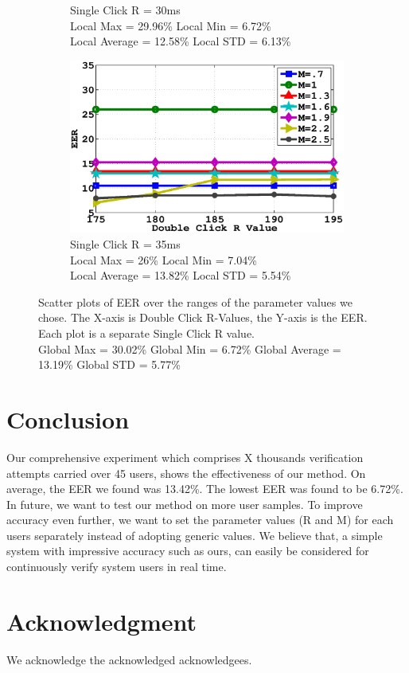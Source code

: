 \documentclass[conference]{IEEEtran}
\begin{document}
\begin{figure}[b!]
\begin{subfigure}{.5\textwidth}
  \caption{Single Click R = 30ms \\Local Max = 29.96\% Local Min = 6.72\% \\Local Average = 12.58\% Local STD = 6.13\%}
  \label{fig:sfig3}
\end{subfigure}%
\begin{subfigure}{.5\textwidth}
  \centering
  \includegraphics[width=.8\linewidth]{35.eps}
  \caption{Single Click R = 35ms \\Local Max = 26\% Local Min = 7.04\%\\Local Average = 13.82\% Local STD = 5.54\%}
  \label{fig:sfig4}
\end{subfigure}
\caption{Scatter plots of EER over the ranges of the parameter values we chose. The X-axis is Double Click R-Values, the Y-axis is the EER. Each plot is a separate Single Click R value. \\Global Max = 30.02\% Global Min = 6.72\% Global Average = 13.19\% Global STD = 5.77\%}
\label{fig:fig}
\end{figure}


\section{Conclusion}

Our comprehensive experiment which comprises X thousands verification attempts carried over 45 users, shows the effectiveness of our method. On average, the EER we found was 13.42\%. The lowest EER was found to be 6.72\%. In future, we want to test our method on more user samples. To improve accuracy even further, we want to set the parameter values (R and M) for each users separately instead of adopting generic values. We believe that, a simple system with impressive accuracy such as ours, can easily be considered for continuously verify system users in real time.    

\section*{Acknowledgment}
We acknowledge the acknowledged acknowledgees.
\end{document}
